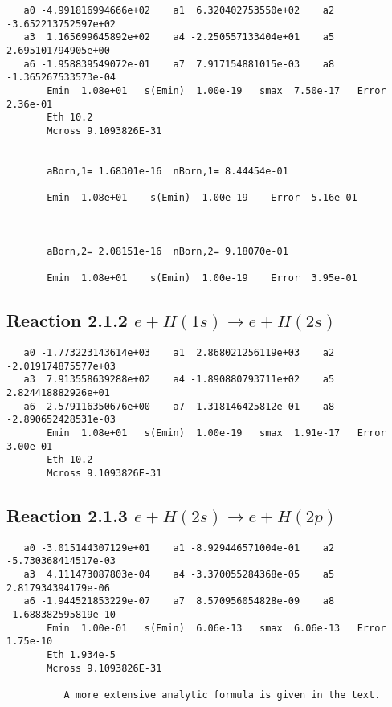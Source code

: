 \documentclass[12pt,dvipdfmx]{article}
\begin{document}
\begin{small}\begin{verbatim}
   a0 -4.991816994666e+02    a1  6.320402753550e+02    a2 -3.652213752597e+02
   a3  1.165699645892e+02    a4 -2.250557133404e+01    a5  2.695101794905e+00
   a6 -1.958839549072e-01    a7  7.917154881015e-03    a8 -1.365267533573e-04
       Emin  1.08e+01   s(Emin)  1.00e-19   smax  7.50e-17   Error  2.36e-01
       Eth 10.2
       Mcross 9.1093826E-31


       aBorn,1= 1.68301e-16  nBorn,1= 8.44454e-01

       Emin  1.08e+01    s(Emin)  1.00e-19    Error  5.16e-01



       aBorn,2= 2.08151e-16  nBorn,2= 9.18070e-01

       Emin  1.08e+01    s(Emin)  1.00e-19    Error  3.95e-01
\end{verbatim}\end{small}


\newpage
\subsection{
Reaction 2.1.2 $   e + H(1s) \rightarrow e + H(2s) $}

\begin{small}\begin{verbatim}
   a0 -1.773223143614e+03    a1  2.868021256119e+03    a2 -2.019174875577e+03
   a3  7.913558639288e+02    a4 -1.890880793711e+02    a5  2.824418882926e+01
   a6 -2.579116350676e+00    a7  1.318146425812e-01    a8 -2.890652428531e-03
       Emin  1.08e+01   s(Emin)  1.00e-19   smax  1.91e-17   Error  3.00e-01
       Eth 10.2
       Mcross 9.1093826E-31
\end{verbatim}\end{small}



\newpage
\subsection{
Reaction 2.1.3 $   e + H(2s) \rightarrow e + H(2p)$}


\begin{small}\begin{verbatim}
   a0 -3.015144307129e+01    a1 -8.929446571004e-01    a2 -5.730368414517e-03
   a3  4.111473087803e-04    a4 -3.370055284368e-05    a5  2.817934394179e-06
   a6 -1.944521853229e-07    a7  8.570956054828e-09    a8 -1.688382595819e-10
       Emin  1.00e-01   s(Emin)  6.06e-13   smax  6.06e-13   Error  1.75e-10
       Eth 1.934e-5
       Mcross 9.1093826E-31

          A more extensive analytic formula is given in the text.
\end{verbatim}\end{small}
\end{document}

